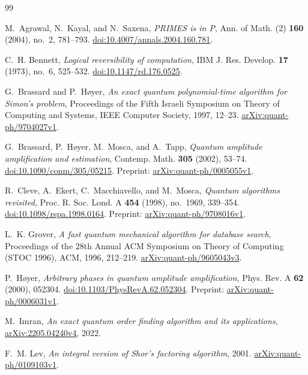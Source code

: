 \begin{thebibliography}{99}

M.~Agrawal, N.~Kayal, and N.~Saxena,
\emph{PRIMES is in P},
Ann. of Math. (2) \textbf{160} (2004), no.~2, 781--793.
\href{https://doi.org/10.4007/annals.2004.160.781}{doi:10.4007/annals.2004.160.781}.

C.~H. Bennett,
\emph{Logical reversibility of computation},
IBM J. Res. Develop. \textbf{17} (1973), no.~6, 525--532.
\href{https://doi.org/10.1147/rd.176.0525}{doi:10.1147/rd.176.0525}.

G.~Brassard and P.~H{\o}yer,
\emph{An exact quantum polynomial-time algorithm for Simon's problem},
Proceedings of the Fifth Israeli Symposium on Theory of Computing
and Systems, IEEE Computer Society, 1997, 12--23.
\href{https://arxiv.org/abs/quant-ph/9704027v1}{arXiv:quant-ph/9704027v1}.

G.~Brassard, P.~H{\o}yer, M.~Mosca, and A.~Tapp,
\emph{Quantum amplitude amplification and estimation},
Contemp. Math. \textbf{305} (2002), 53--74.
\href{https://doi.org/10.1090/conm/305/05215}{doi:10.1090/conm/305/05215}.
Preprint: \href{https://arxiv.org/abs/quant-ph/0005055v1}{arXiv:quant-ph/0005055v1}.

R.~Cleve, A.~Ekert, C.~Macchiavello, and M.~Mosca,
\emph{Quantum algorithms revisited},
Proc. R. Soc. Lond. A \textbf{454} (1998), no.~1969, 339--354.
\href{https://doi.org/10.1098/rspa.1998.0164}{doi:10.1098/rspa.1998.0164}.
Preprint: \href{https://arxiv.org/abs/quant-ph/9708016v1}{arXiv:quant-ph/9708016v1}.

L.~K. Grover,
\emph{A fast quantum mechanical algorithm for database search},
Proceedings of the 28th Annual ACM Symposium on Theory of Computing
(STOC 1996), ACM, 1996, 212--219.
\href{https://arxiv.org/abs/quant-ph/9605043v3}{arXiv:quant-ph/9605043v3}.

P.~H{\o}yer,
\emph{Arbitrary phases in quantum amplitude amplification},
Phys. Rev. A \textbf{62} (2000), 052304.
\href{https://doi.org/10.1103/PhysRevA.62.052304}{doi:10.1103/PhysRevA.62.052304}.
Preprint: \href{https://arxiv.org/abs/quant-ph/0006031v1}{arXiv:quant-ph/0006031v1}.

M.~Imran,
\emph{An exact quantum order finding algorithm and its applications},
\href{https://arxiv.org/abs/2205.04240v4}{arXiv:2205.04240v4}, 2022.

F.~M. Lev,
\emph{An integral version of Shor's factoring algorithm},
2001.
\href{https://arxiv.org/abs/quant-ph/0109103v1}{arXiv:quant-ph/0109103v1}.


\end{thebibliography}
